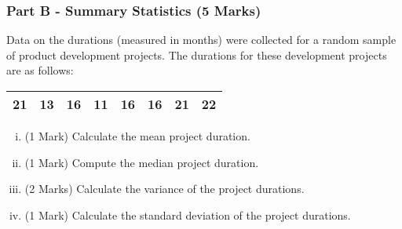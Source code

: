 \documentclass[a4paper,12pt]{article}
\begin{document}
\vspace{0.25cm}
\subsubsection*{Part B - Summary Statistics (5 Marks)} %
Data on the durations (measured in months) were collected for a random sample of product development projects. The durations for these development projects are as follows:

\begin{table}[ht]
	\centering
	\begin{tabular}{|rrrrrrrr|}
		\hline
		
		21 &  13 &  16 &  11 &  16 &  16 &  21 &  22 \\ 
		\hline
	\end{tabular}
\end{table}
\vspace{-0.5cm}


\begin{enumerate}[(i)]
	\item (1 Mark) Calculate the mean project duration.
	\item (1 Mark) Compute the median project duration.
	\item (2 Marks) Calculate the variance of the project durations.
	\item (1 Mark) Calculate the standard deviation of the project durations.
\end{enumerate}

%		
%		
\newpage
\end{document}
